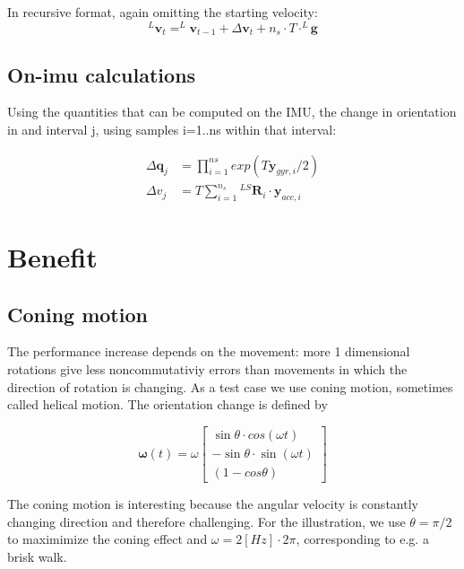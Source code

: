\documentclass{article}
\begin{document}
In recursive format, again omitting the starting velocity:
\begin{equation}
^L\textbf{v}_t = ^L\textbf{v}_{t-1} + \Delta \textbf{v}_t +  n_s \cdot T \cdot ^L\boldsymbol{g}
\end{equation}

\subsection{On-imu calculations}
Using the quantities that can be computed on the IMU, the change in orientation in and interval j, using samples i=1..ns within that interval:

\begin{equation} \label{eq:deltas}
\begin{aligned}
\Delta \boldsymbol{q}_j &= \prod_{i=1}^{ns} exp(T\boldsymbol{y}_{gyr,i}/2)\\
\Delta v_j &=  T \sum_{i=1}^{n_s} {}^{LS}\boldsymbol{R}_i \cdot \boldsymbol{y}_{acc,i} 
\end{aligned}
\end{equation}

\section{Benefit}

\subsection{Coning motion}
The performance increase depends on the movement: more 1 dimensional rotations give less noncommutativiy errors than movements in which the direction of rotation is changing. As a test case we use coning motion, sometimes called helical motion. The orientation change is defined by 

\begin{equation} \label{eq:coning_angular_velocity}
\boldsymbol{\omega}(t) = \omega \begin{bmatrix}
\sin \theta \cdot cos(\omega t) \\
-\sin \theta \cdot \sin(\omega t) \\
 (1 - cos \theta)
\end{bmatrix}
\end{equation}

The coning motion is interesting because the angular velocity is constantly changing direction and therefore challenging. For the illustration, we use $\theta=\pi /2$ to maximimize the coning effect and  $\omega=2[Hz] \cdot 2\pi$, corresponding to e.g. a brisk walk.
\end{document}
